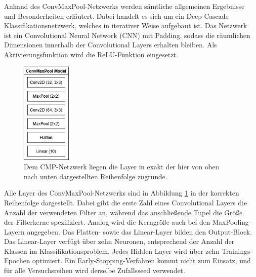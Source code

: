 Anhand des ConvMaxPool-Netzwerks werden sämtliche allgemeinen Ergebnisse und Besonderheiten erläutert. Dabei handelt es sich um ein Deep 
Cascade Klassifikationsnetzwerk, welches in iterativer Weise aufgebaut ist. Das Netzwerk ist ein Convolutional Neural Network (CNN) mit Padding, 
sodass die räumlichen Dimensionen innerhalb der Convolutional Layers erhalten bleiben. Als Aktivierungsfunktion wird die ReLU-Funktion 
eingesetzt.

\begin{figure}[htpb]
    \centering
    \includegraphics[height=5cm]{../../Graphiken/convmaxpool.png}
    \caption{\label{fig:convmaxpool} 
    \small{Dem CMP-Netzwerk liegen die Layer in exakt der hier von oben nach unten dargestellten Reihenfolge zugrunde.}}
\end{figure}

Alle Layer des ConvMaxPool-Netzwerks sind in Abbildung \ref{fig:convmaxpool} in der korrekten Reihenfolge dargestellt. Dabei gibt die erste 
Zahl eines Convolutional Layers die Anzahl der verwendeten Filter an, während das anschließende Tupel die Größe der Filterkerne spezifiziert. 
Analog wird die Kerngröße auch bei den MaxPooling-Layern angegeben. Das Flatten- sowie das Linear-Layer bilden den Output-Block. Das 
Linear-Layer verfügt über zehn Neuronen, entsprechend der Anzahl der Klassen im Klassifikationsproblem. Jedes Hidden Layer wird über zehn 
Trainings-Epochen optimiert. Ein Early-Stopping-Verfahren kommt nicht zum Einsatz, und für alle Versuchsreihen wird derselbe Zufallsseed 
verwendet.
